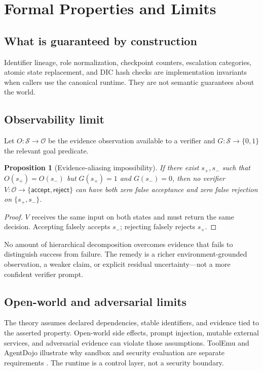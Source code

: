 \documentclass[11pt]{article}
\newtheorem{proposition}[definition]{Proposition}
\newcommand{\State}{\mathcal S}
\begin{document}
\section{Formal Properties and Limits}
\subsection{What is guaranteed by construction}
Identifier lineage, role normalization, checkpoint counters, escalation categories, atomic state replacement, and DIC hash checks are implementation invariants when callers use the canonical runtime. They are not semantic guarantees about the world.

\subsection{Observability limit}
Let $O:\State\to\mathcal O$ be the evidence observation available to a verifier and $G:\State\to\{0,1\}$ the relevant goal predicate.
\begin{proposition}[Evidence-aliasing impossibility]
\label{prop:observability}
If there exist $s_+,s_-$ such that $O(s_+)=O(s_-)$ but $G(s_+)=1$ and $G(s_-)=0$, then no verifier $V:\mathcal O\to\{\textsf{accept},\textsf{reject}\}$ can have both zero false acceptance and zero false rejection on $\{s_+,s_-\}$.
\end{proposition}
\begin{proof}
$V$ receives the same input on both states and must return the same decision. Accepting falsely accepts $s_-$; rejecting falsely rejects $s_+$.
\end{proof}
No amount of hierarchical decomposition overcomes evidence that fails to distinguish success from failure. The remedy is a richer environment-grounded observation, a weaker claim, or explicit residual uncertainty---not a more confident verifier prompt.

\subsection{Open-world and adversarial limits}
The theory assumes declared dependencies, stable identifiers, and evidence tied to the asserted property. Open-world side effects, prompt injection, mutable external services, and adversarial evidence can violate those assumptions. ToolEmu and AgentDojo illustrate why sandbox and security evaluation are separate requirements \citep{ruan2024toolemu,debenedetti2024agentdojo}. The runtime is a control layer, not a security boundary.
\end{document}
